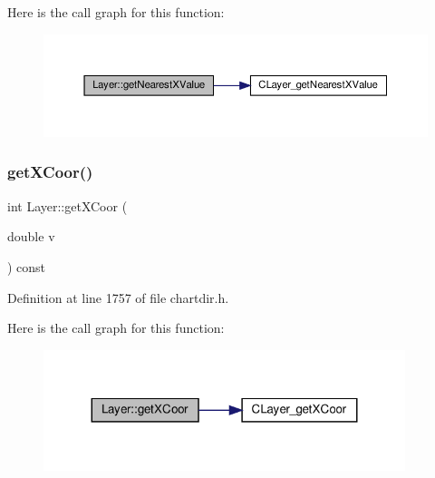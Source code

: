 Here is the call graph for this function\+:
\nopagebreak
\begin{figure}[H]
\begin{center}
\leavevmode
\includegraphics[width=350pt]{class_layer_aec99cc6d249936a4314f8388dc443b3d_cgraph}
\end{center}
\end{figure}
\mbox{\label{class_layer_a9083b20a158e7096c52539f95dfd47a9}} 
\subsubsection{\texorpdfstring{get\+X\+Coor()}{getXCoor()}}
{\footnotesize\ttfamily int Layer\+::get\+X\+Coor (\begin{DoxyParamCaption}\item[{double}]{v }\end{DoxyParamCaption}) const\hspace{0.3cm}{\ttfamily [inline]}}



Definition at line 1757 of file chartdir.\+h.

Here is the call graph for this function\+:
\nopagebreak
\begin{figure}[H]
\begin{center}
\leavevmode
\includegraphics[width=299pt]{class_layer_a9083b20a158e7096c52539f95dfd47a9_cgraph}
\end{center}
\end{figure}
\mbox{\label{class_layer_a6d450eda89af1922a7223ee02e00af95}} 

